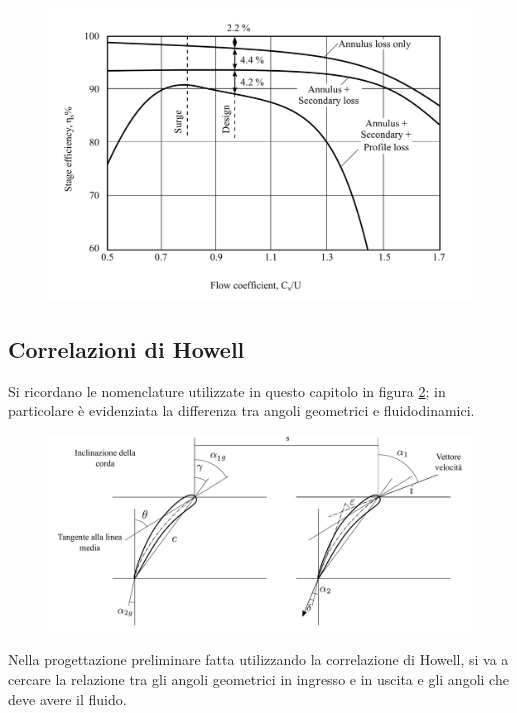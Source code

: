 \begin{figure}
\centering
  \includegraphics[width=\textwidth]{fig/ComprStageLoss.pdf}
\caption{}
\label{fig:ComprStageLoss}
\end{figure}
\subsection{Correlazioni di Howell}
Si ricordano le nomenclature utilizzate in questo capitolo in figura \ref{fig:SchieraDim}; in particolare è evidenziata la differenza tra angoli geometrici e fluidodinamici.
\begin{figure}
	\centering
	\includegraphics[width=\textwidth]{fig/SchieraDim.pdf}
	\caption{}
	\label{fig:SchieraDim}
\end{figure}

Nella progettazione preliminare fatta utilizzando la correlazione di Howell, si va a cercare la relazione tra gli angoli geometrici in ingresso e in uscita e gli angoli che deve avere il fluido.


